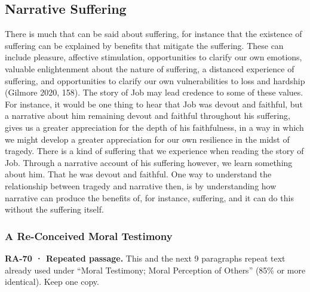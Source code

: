 \documentclass[
  letterpaper,
  DIV=11,
  numbers=noendperiod]{scrartcl}
\theoremstyle{remark}
\begin{document}
\subsection{Narrative Suffering}\label{narrative-suffering}

There is much that can be said about suffering, for instance that the
existence of suffering can be explained by benefits that mitigate the
suffering. These can include pleasure, affective stimulation,
opportunities to clarify our own emotions, valuable enlightenment about
the nature of suffering, a distanced experience of suffering, and
opportunities to clarify our own vulnerabilities to loss and hardship
(Gilmore 2020, 158). The story of Job may lead credence to some of these
values. For instance, it would be one thing to hear that Job was devout
and faithful, but a narrative about him remaining devout and faithful
throughout his suffering, gives us a greater appreciation for the depth
of his faithfulness, in a way in which we might develop a greater
appreciation for our own resilience in the midst of tragedy. There is a
kind of suffering that we experience when reading the story of Job.
Through a narrative account of his suffering however, we learn something
about him. That he was devout and faithful. One way to understand the
relationship between tragedy and narrative then, is by understanding how
narrative can produce the benefits of, for instance, suffering, and it
can do this without the suffering itself.

\subsubsection{A Re-Conceived Moral
Testimony}\label{a-re-conceived-moral-testimony}

\begin{tcolorbox}[enhanced jigsaw, arc=.35mm, bottomrule=.15mm, bottomtitle=1mm, breakable, colback=white, colbacktitle=quarto-callout-important-color!10!white, colframe=quarto-callout-important-color-frame, coltitle=black, left=2mm, leftrule=.75mm, opacityback=0, opacitybacktitle=0.6, rightrule=.15mm, title=\textcolor{quarto-callout-important-color}{\faExclamation}\hspace{0.5em}{Important}, titlerule=0mm, toprule=.15mm, toptitle=1mm]

\textbf{RA-70 · Repeated passage.} This and the next 9 paragraphs repeat
text already used under ``Moral Testimony; Moral Perception of Others''
(85\% or more identical). Keep one copy.

\end{tcolorbox}
\end{document}
